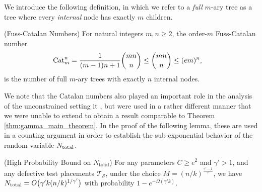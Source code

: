 We introduce the following definition, in which we refer to a \textit{full} $m$-ary tree as a tree where every \textit{internal} node has exactly $m$ children.
 
\begin{lemma}\label{lem:cat_num} \textup{\cite[Prop.~3.1]{AVAL08} (Fuss-Catalan Numbers)} 
For natural integers $m,n\geq2$, the order-$m$ Fuss-Catalan number
\begin{align}
    \textup{Cat}_m^{n}&=\frac{1}{(m-1)n+1}{mn\choose n}
    \leq{mn\choose n}
    \leq(em)^n,
\end{align}
is the number of full $m$-ary trees with exactly $n$ internal nodes.
\end{lemma}

We note that the Catalan numbers also played an important role in the analysis of the unconstrained setting it \cite{cher20}, but were used in a rather different manner that we were unable to extend to obtain a result comparable to Theorem \ref{thm:gamma_main_theorem}.  In the proof of the following lemma, these are used in a counting argument in order to establish the sub-exponential behavior of the random variable $N_{\rm total}$.

\begin{lemma} \label{lem:N_total_high_prob_bound_gamma} \textup{(High Probability Bound on $N_{\text{total}}$)}
For any parameters $C\geq e^2$ and $\gamma'>1$, and any defective test placements $\mathcal{T}_{\mathcal{S}}$, under the choice $M=(n/k)^{\frac{\gamma'-1}{\gamma'}}$, we have $N_{\textup{total}}=O\big(\gamma'k(n/k)^{1/\gamma'}\big)$ with probability $1-e^{-\Omega(\gamma'k)}$.
\end{lemma}

